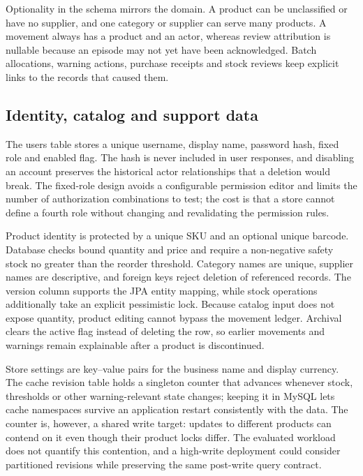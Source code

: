 Optionality in the schema mirrors the domain. A product can be unclassified or have no supplier, and one category or supplier can serve many products. A movement always has a product and an actor, whereas review attribution is nullable because an episode may not yet have been acknowledged. Batch allocations, warning actions, purchase receipts and stock reviews keep explicit links to the records that caused them.


\subsection{Identity, catalog and support data}

The users table stores a unique username, display name, password hash, fixed role and enabled flag. The hash is never included in user responses, and disabling an account preserves the historical actor relationships that a deletion would break. The fixed-role design avoids a configurable permission editor and limits the number of authorization combinations to test; the cost is that a store cannot define a fourth role without changing and revalidating the permission rules.


Product identity is protected by a unique SKU and an optional unique barcode. Database checks bound quantity and price and require a non-negative safety stock no greater than the reorder threshold. Category names are unique, supplier names are descriptive, and foreign keys reject deletion of referenced records. The version column supports the JPA entity mapping, while stock operations additionally take an explicit pessimistic lock. Because catalog input does not expose quantity, product editing cannot bypass the movement ledger. Archival clears the active flag instead of deleting the row, so earlier movements and warnings remain explainable after a product is discontinued.


Store settings are key–value pairs for the business name and display currency. The cache revision table holds a singleton counter that advances whenever stock, thresholds or other warning-relevant state changes; keeping it in MySQL lets cache namespaces survive an application restart consistently with the data. The counter is, however, a shared write target: updates to different products can contend on it even though their product locks differ. The evaluated workload does not quantify this contention, and a high-write deployment could consider partitioned revisions while preserving the same post-write query contract.


